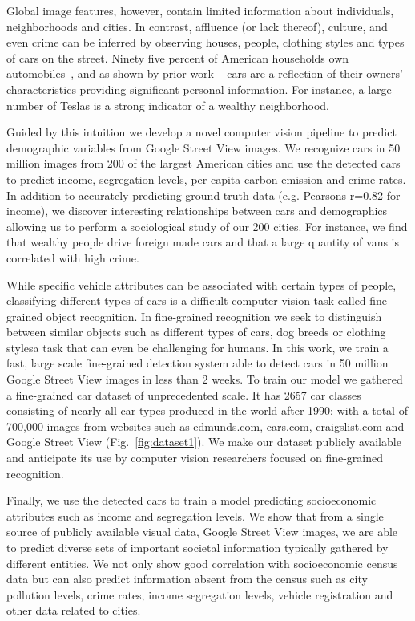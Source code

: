 \documentclass[letterpaper]{article}
\begin{document}
Global image features, however, contain limited information about individuals, neighborhoods and cities. In contrast, affluence (or lack thereof), culture, and even crime can be inferred by observing houses, people, clothing styles and types of cars on the street. Ninety five percent of American households own automobiles~\cite{car_stats}, and as shown by prior work ~\cite{car_personality} cars are a reflection of their owners' characteristics providing significant personal information. For instance, a large number of Teslas is a strong indicator of a wealthy neighborhood.

Guided by this intuition we develop a novel computer vision pipeline to predict demographic variables from Google Street View images. We recognize cars in 50 million images from 200 of the largest American cities and use the detected cars to predict  income, segregation levels, per capita carbon emission and crime rates. In addition to accurately predicting ground truth data (e.g. Pearsons r=0.82 for income), we discover interesting relationships between cars and demographics allowing us to perform a sociological study of our 200 cities. For instance, we find that wealthy people drive foreign made cars and that a large quantity of vans is correlated with high crime.

While specific vehicle attributes can be associated with certain types of people, classifying different types of cars is a difficult computer vision task called fine-grained object recognition. In fine-grained recognition we seek to distinguish between similar objects such as different types of cars, dog breeds or clothing styles\textemdash a task that can even be challenging for humans. In this work, we train a fast, large scale fine-grained detection system able to detect cars in 50 million Google Street View images in less than 2 weeks. To train our model we gathered a fine-grained car dataset of unprecedented scale. It has 2657 car classes consisting of nearly all car types produced in the world after 1990: with a total of 700,000 images from websites such as edmunds.com, cars.com, craigslist.com and Google Street View (Fig.~\ref{fig:dataset1}). We make our dataset publicly available and anticipate its use by computer vision researchers focused on fine-grained recognition.

Finally, we use the detected cars to train a model predicting socioeconomic attributes such as income and segregation levels. We show that from a single source of publicly available visual data, Google Street View images, we are able to predict diverse sets of important societal information typically gathered by different entities. We not only show good correlation with socioeconomic census data but can also predict information absent from the census such as city pollution levels, crime rates, income segregation levels, vehicle registration and other data related to cities.
\end{document}
